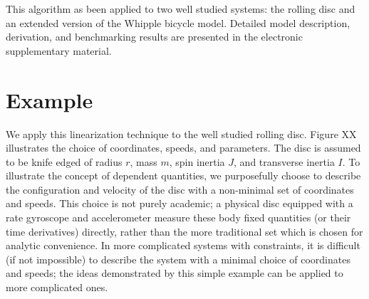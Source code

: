 \documentclass[smallcondensed]{svjour3}                     %
\begin{document}
This algorithm as been applied to two well studied systems: the rolling disc
and an extended version of the Whipple bicycle model\cite{Meijaard2007}.
Detailed model description, derivation, and benchmarking results are presented
in the electronic supplementary material.

\section{Example}
\label{example}
We apply this linearization technique to the well studied rolling disc.  Figure
XX illustrates the choice of coordinates, speeds, and parameters.  The disc is
assumed to be knife edged of radius $r$, mass $m$, spin inertia $J$, and
transverse inertia $I$.  To illustrate the concept of dependent quantities, we
purposefully choose to describe the configuration and velocity of the disc with
a non-minimal set of coordinates and speeds.  This choice is not purely
academic; a physical disc equipped with a rate gyroscope and accelerometer
measure these body fixed quantities (or their time derivatives) directly,
rather than the more traditional set which is chosen for analytic convenience.
In more complicated systems with constraints, it is difficult (if not
impossible) to describe the system with a minimal choice of coordinates and
speeds; the ideas demonstrated by this simple example can be applied to more
complicated ones.
\end{document}
